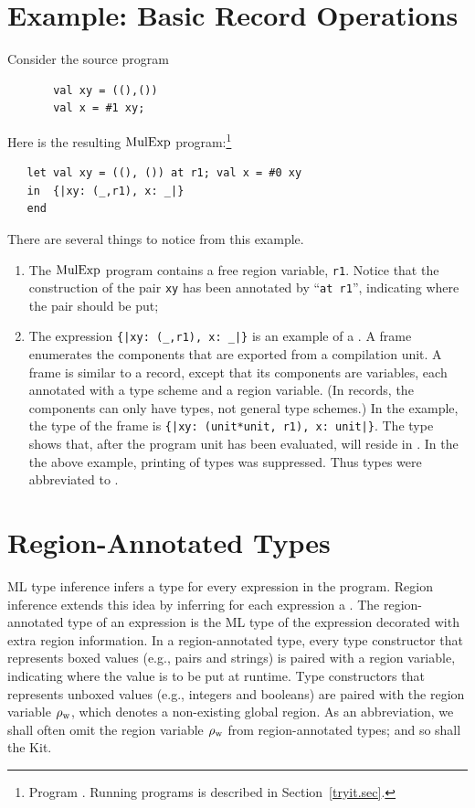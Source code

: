 \documentclass[12pt]{book}
\newcommand{\rhoword}{\rho_{\rm w}}
\begin{document}
\section{Example: Basic Record Operations}
\label{proj.ex}
Consider the source program
\begin{verbatim}
       val xy = ((),()) 
       val x = #1 xy;
\end{verbatim}
Here is the resulting $\hbox{\rm MulExp}$ program:\footnote{Program
  . Running programs is described in
  Section~\ref{tryit.sec}.}
\begin{verbatim}
   let val xy = ((), ()) at r1; val x = #0 xy
   in  {|xy: (_,r1), x: _|}
   end 
\end{verbatim}
There are several things to notice from this example. 
\begin{enumerate}
\item The $\hbox{\rm MulExp}$ program contains a free region variable,
      {\tt r1}. Notice that the construction of the
      pair {\tt xy} has been annotated by ``{\tt at r1}'', indicating
      where the pair should be put;
\item The expression \verb+{|xy: (_,r1), x: _|}+ is
      an example of a . A frame enumerates
      the components that are exported from a compilation unit.
      A frame is similar to a record, except that its components
      are variables, each annotated with a type scheme and
      a region variable. (In records, the components can only
      have types, not general type schemes.) In the example,
      the type of the frame is \verb+{|xy: (unit*unit, r1), x: unit|}+. 
      The type shows that, after the program unit has been
      evaluated,   will reside in .
      In the the above example, printing of types was suppressed. Thus
      types were abbreviated to \boxml{\_}.
\end{enumerate}
\section{Region-Annotated Types}
\label{reganntypes.sec}
ML type inference infers a type for every expression in the program.
Region inference extends this idea by inferring for each expression a
. The
region-annotated type of an expression is the ML type of the
expression decorated with extra region information.  In a
region-annotated type, every type constructor that represents boxed
values (e.g., pairs and strings) is paired with a region variable,
indicating where the value is to be put at runtime. Type constructors
that represents unboxed values (e.g., integers and booleans) are
paired with the region variable $\rhoword$, which denotes a
non-existing global region. As an
abbreviation, we shall often omit the region variable $\rhoword$ from
region-annotated types; and so shall the Kit.
\end{document}
